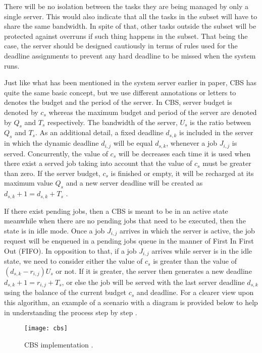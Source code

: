 There will be no isolation between the tasks they are being managed by only a single server. This would also indicate that all the tasks in the subset will have to share the same bandwidth. In spite of that, other tasks outside the subset will be protected against overruns if such thing happens in the subset. That being the case, the server should be designed cautiously in terms of rules used for the deadline assignments to prevent any hard deadline to be missed when the system runs. 

Just like what has been mentioned in the system server earlier in paper, CBS has quite the same basic concept, but we use different annotations or letters to denotes the budget and the period of the server. In CBS, server budget is denoted by $c_{s}$ whereas the maximum budget and period of the server are denoted by $Q_{s}$ and $T_{s}$ respectively. The bandwidth of the server, $U_{s}$ is the ratio between $Q_{s}$ and $T_{s}$. As an additional detail, a fixed deadline $d_{s,k}$ is included in the server in which the dynamic deadline $d_{i,j}$ will be equal $d_{s,k}$, whenever a job $J_{i,j}$ is served. Concurrently, the value of $c_{s}$ will be decreases each time it is used when there exist a served job taking into account that the value of $c_{s}$ must be greater than zero. If the server budget, $c_{s}$ is finished or empty, it will be recharged at its maximum value $Q_{s}$ and a new server deadline will be created as $d_{s,k}+1 = d_{s,k} + T_{s}$  \cite{b2}. 

If there exist pending jobs, then a CBS is meant to be in an active state meanwhile when there are no pending jobs that need to be executed, then the state is in idle mode. Once a job $J_{i,j}$ arrives in which the server is active, the job request will be enqueued in a pending jobs queue in the manner of First In First Out (FIFO). In opposition to that, if a job $J_{i,j}$ arrives while server is in the idle state, we need to consider either the value of $c_{s}$ is greater than the value of $(d_{s,k} - r_{i,j})U_{s}$ or not. If it is greater, the server then generates a new deadline $d_{s,k}+1= r_{i,j} + T_{s}$, or else the job will be served with the last server deadline $d_{s,k}$ using the balance of the current budget $c_{s}$ and deadline. For a clearer view upon this algorithm, an example of a scenario with a diagram is provided below to help in understanding the process step by step \cite{b2}.

\begin{figure}[htp]
    \centering
    \texttt{[image: cbs]}
    \caption{CBS implementation \cite{b2}.}
    \label{cbs}
\end{figure}

